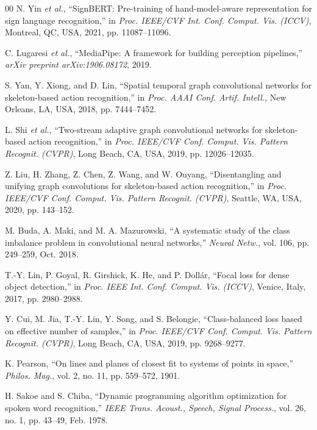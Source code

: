 \documentclass{ieeeaccess}
\begin{document}
\begin{thebibliography}{00}
N. Yin \emph{et al.}, ``SignBERT: Pre-training of hand-model-aware representation for sign language recognition,'' in \emph{Proc. IEEE/CVF Int. Conf. Comput. Vis. (ICCV)}, Montreal, QC, USA, 2021, pp. 11087--11096.

C. Lugaresi \emph{et al.}, ``MediaPipe: A framework for building perception pipelines,'' \emph{arXiv preprint arXiv:1906.08172}, 2019.

S. Yan, Y. Xiong, and D. Lin, ``Spatial temporal graph convolutional networks for skeleton-based action recognition,'' in \emph{Proc. AAAI Conf. Artif. Intell.}, New Orleans, LA, USA, 2018, pp. 7444--7452.

L. Shi \emph{et al.}, ``Two-stream adaptive graph convolutional networks for skeleton-based action recognition,'' in \emph{Proc. IEEE/CVF Conf. Comput. Vis. Pattern Recognit. (CVPR)}, Long Beach, CA, USA, 2019, pp. 12026--12035.

Z. Liu, H. Zhang, Z. Chen, Z. Wang, and W. Ouyang, ``Disentangling and unifying graph convolutions for skeleton-based action recognition,'' in \emph{Proc. IEEE/CVF Conf. Comput. Vis. Pattern Recognit. (CVPR)}, Seattle, WA, USA, 2020, pp. 143--152.

M. Buda, A. Maki, and M. A. Mazurowski, ``A systematic study of the class imbalance problem in convolutional neural networks,'' \emph{Neural Netw.}, vol. 106, pp. 249--259, Oct. 2018.

T.-Y. Lin, P. Goyal, R. Girshick, K. He, and P. Dollár, ``Focal loss for dense object detection,'' in \emph{Proc. IEEE Int. Conf. Comput. Vis. (ICCV)}, Venice, Italy, 2017, pp. 2980--2988.

Y. Cui, M. Jia, T.-Y. Lin, Y. Song, and S. Belongie, ``Class-balanced loss based on effective number of samples,'' in \emph{Proc. IEEE/CVF Conf. Comput. Vis. Pattern Recognit. (CVPR)}, Long Beach, CA, USA, 2019, pp. 9268--9277.

K. Pearson, ``On lines and planes of closest fit to systems of points in space,'' \emph{Philos. Mag.}, vol. 2, no. 11, pp. 559--572, 1901.

H. Sakoe and S. Chiba, ``Dynamic programming algorithm optimization for spoken word recognition,'' \emph{IEEE Trans. Acoust., Speech, Signal Process.}, vol. 26, no. 1, pp. 43--49, Feb. 1978.


\end{thebibliography}
\end{document}
